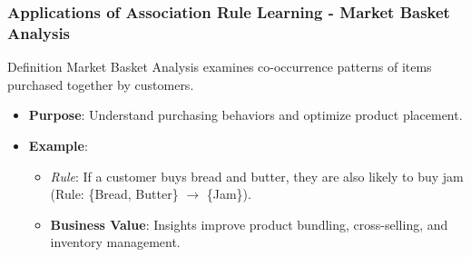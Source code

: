\documentclass{beamer}
\begin{document}
\begin{frame}[fragile]
    \frametitle{Applications of Association Rule Learning - Market Basket Analysis}
    \begin{block}{Definition}
        Market Basket Analysis examines co-occurrence patterns of items purchased together by customers.
    \end{block}
    \begin{itemize}
        \item \textbf{Purpose}: Understand purchasing behaviors and optimize product placement.
        \item \textbf{Example}: 
        \begin{itemize}
            \item \textit{Rule}: If a customer buys bread and butter, they are also likely to buy jam (Rule: \{Bread, Butter\} $\rightarrow$ \{Jam\}).
            \item \textbf{Business Value}: Insights improve product bundling, cross-selling, and inventory management.
        \end{itemize}
    \end{itemize}
\end{frame}
\end{document}
